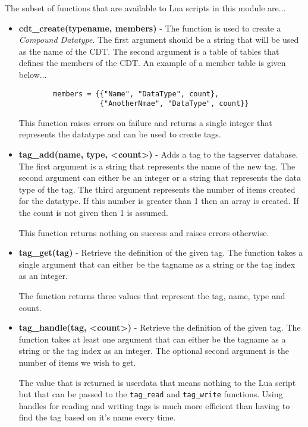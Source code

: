 The subset of functions that are available to Lua scripts in this module are...

\begin{itemize}
	\item \textbf{cdt\_create(typename, members)} - The function is used to
	create a
	\textit{Compound Datatype}.  The first argument should be a string that
	will be used as the name of the CDT.  The second argument is a table of
	tables that defines the members of the CDT.  An example of a member
    table is given below...
    \begin{verbatim}
        members = {{"Name", "DataType", count},
                   {"AnotherNmae", "DataType", count}}
    \end{verbatim}

    This function raises errors on failure and returns a single integer that
    represents the datatype and can be used to create tags.

	\item \textbf{tag\_add(name, type, <count>)} - Adds a tag to the tagserver
	database.  The first argument is a string that
    represents the name of the new tag.  The second argument can either be an
    integer or a string that represents the data type of the tag.  The third
    argument represents the number of items created for the datatype.
    If this number is greater than 1 then an array is created.  If the count is
    not given then 1 is assumed.

    This function returns nothing on success and raises errors otherwise.

	\item \textbf{tag\_get(tag)} - Retrieve the definition of the given tag.
	The function takes a single
    argument that can either be the tagname as a string or the tag index as an
    integer.

    The function returns three values that represent the tag, name, type and
    count.

	\item \textbf{tag\_handle(tag, <count>)} - Retrieve the definition of the
	given tag.  The function takes at least one
    argument that can either be the tagname as a string or the tag index as an
    integer.  The optional second argument is the number of items we wish
    to get.

    The value that is returned is userdata that means nothing to the Lua script
    but that can be passed to the \texttt{tag\_read} and \texttt{tag\_write}
    functions.  Using handles for reading and writing tags is much more
    efficient
    than having to find the tag based on it's name every time.


\end{itemize}
